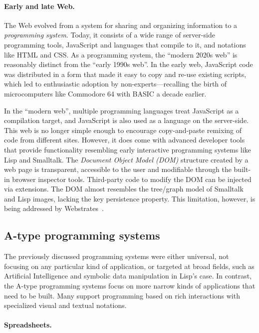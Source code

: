 \paragraph{Early and late Web.}

The Web evolved from a system for sharing and organizing information to
a \emph{programming system}. Today, it consists of a wide range of
server-side programming tools, JavaScript and languages that compile to
it, and notations like HTML and CSS. As a programming system, the
``modern 2020s web'' is reasonably distinct from the ``early 1990s
web''. In the early web, JavaScript code was distributed in a form that
made it easy to copy and re-use existing scripts, which led to
enthusiastic adoption by non-experts---recalling the birth of
microcomputers like Commodore 64 with BASIC a decade earlier.

In the ``modern web'', multiple programming languages treat JavaScript
as a compilation target, and JavaScript is also used as a language on
the server-side. This web is no longer simple enough to encourage
copy-and-paste remixing of code from different sites. However, it does
come with advanced developer tools that provide functionality resembling
early interactive programming systems like Lisp and Smalltalk. The
\emph{Document Object Model (DOM)} structure created by a web page is
transparent, accessible to the user and modifiable through the built-in
browser inspector tools. Third-party code to modify the DOM can be
injected via extensions. The DOM almost resembles the tree/graph model
of Smalltalk and Lisp images, lacking the key persistence property. This
limitation, however, is being addressed by Webstrates~\cite{Webstrates}.

\hypertarget{a-type-programming-systems}{%
\subsection{A-type programming
systems}\label{a-type-programming-systems}}

The previously discussed programming systems were either universal, not
focusing on any particular kind of application, or targeted at broad
fields, such as Artificial Intelligence and symbolic data manipulation
in Lisp's case. In contrast, the A-type programming systems focus on
more narrow kinds of applications that need to be built. Many support
programming based on rich interactions with specialized visual and
textual notations.

\paragraph{Spreadsheets.}

